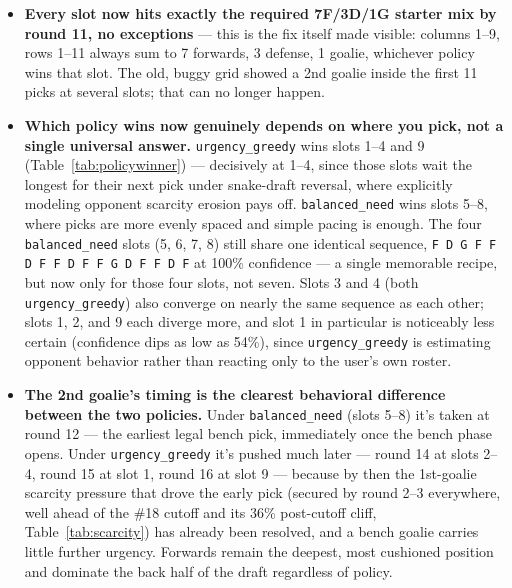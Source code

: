 \documentclass[11pt, a4paper]{article}
\begin{document}
\begin{itemize}[leftmargin=*]
  \item \textbf{Every slot now hits exactly the required 7F/3D/1G starter mix by round 11, no
        exceptions} — this is the fix itself made visible: columns 1--9, rows 1--11 always sum to
        7 forwards, 3 defense, 1 goalie, whichever policy wins that slot. The old, buggy grid
        showed a 2nd goalie inside the first 11 picks at several slots; that can no longer happen.
  \item \textbf{Which policy wins now genuinely depends on where you pick, not a single universal
        answer.} \texttt{urgency\_greedy} wins slots 1--4 and 9 (Table~\ref{tab:policywinner}) —
        decisively at 1--4, since those slots wait the longest for their next pick under
        snake-draft reversal, where explicitly modeling opponent scarcity erosion pays off.
        \texttt{balanced\_need} wins slots 5--8, where picks are more evenly spaced and simple
        pacing is enough. The four \texttt{balanced\_need} slots (5, 6, 7, 8) still share one
        identical sequence, \texttt{F D G F F D F F D F F G D F F D F} at 100\% confidence — a
        single memorable recipe, but now only for those four slots, not seven. Slots 3 and 4
        (both \texttt{urgency\_greedy}) also converge on nearly the same sequence as each other;
        slots 1, 2, and 9 each diverge more, and slot 1 in particular is noticeably less certain
        (confidence dips as low as 54\%), since \texttt{urgency\_greedy} is estimating opponent
        behavior rather than reacting only to the user's own roster.
  \item \textbf{The 2nd goalie's timing is the clearest behavioral difference between the two
        policies.} Under \texttt{balanced\_need} (slots 5--8) it's taken at round 12 — the
        earliest legal bench pick, immediately once the bench phase opens. Under
        \texttt{urgency\_greedy} it's pushed much later — round 14 at slots 2--4, round 15 at
        slot 1, round 16 at slot 9 — because by then the 1st-goalie scarcity pressure that drove
        the early pick (secured by round 2--3 everywhere, well ahead of the \#18 cutoff and its
        36\% post-cutoff cliff, Table~\ref{tab:scarcity}) has already been resolved, and a bench
        goalie carries little further urgency. Forwards remain the deepest, most cushioned
        position and dominate the back half of the draft regardless of policy.
\end{itemize}
\end{document}
